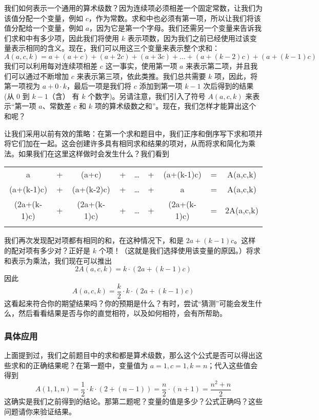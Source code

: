 我们如何表示一个通用的算术级数？因为连续项必须相差一个固定常数，让我们为该值分配一个变量，例如 $c$，作为常数。求和中也必须有第一项，所以让我们将该值分配给一个变量，例如 $a$，因为它是第一个字母。我们还需另一个变量来告诉我们求和中有多少项，因此我们将使用 $k$ 表示项数，因为我们之前已经使用过该变量表示相同的含义。现在，我们可以用这三个变量来表示整个求和：
\[A(a, c, k) = a + (a + c) + (a + 2c) + (a + 3c) + \dots + (a + (k - 2)c) + (a + (k - 1)c)\]
我们可以利用每对连续项相差 $c$ 这一事实，使用第一项 $a$ 来表示第二项，并且我们可以通过不断增加 $c$ 来表示第三项，依此类推。我们总共需要 $k$ 项，因此，将第一项视为 $a+ 0 \cdot k$，最后一项是我们将 $c$ 添加到第一项 $k - 1$ 次后得到的结果(从 $0$ 到 $k - 1$（含） 有 $k$ 个数字)。另请注意，我们引入了符号 $A(a, c, k)$ 来表示“第一项 $a$、常数差 $c$ 和 $k$ 项的算术级数之和”。现在，我们怎样才能算出这个和呢？

让我们采用以前有效的策略：在第一个求和题目中，我们正序和倒序写下求和项并将它们加在一起。这会创建许多具有相同求和结果的项对，从而将求和简化为乘法。如果我们在这里这样做时会发生什么？我们看到

\begin{center}
    \begin{tabular}{ccccccccc}
                 a & + &      (a+c) & + & \dots & + & (a+(k-1)c) & = & A(a,c,k)\\\noalign{\smallskip\smallskip}
        (a+(k-1)c) & + & (a+(k-2)c) & + & \dots & + &          a & = & A(a,c,k)\\\noalign{\smallskip\smallskip}
        \hline
        (2a+(k-1)c)& + & (2a+(k-1)c)& + & \dots & + &(2a+(k-1)c) & = &2A(a,c,k)\\\noalign{\smallskip\smallskip}
    \end{tabular}
\end{center}
我们再次发现配对项都有相同的和，在这种情况下，和是 $2a+ (k-1)c$。这样的配对项有多少对？正好是 $k$ 个项！（这就是我们选择使用该变量的原因。）将求和表示为乘法，我们现在可以推出
\[2A(a, c, k) = k \cdot (2a + (k - 1)c)\]
因此
\[A(a, c, k) = \frac{k}{2} \cdot k \cdot (2a + (k - 1)c)\]
这看起来符合你的期望结果吗？你的预期是什么？有时，尝试“猜测”可能会发生什么，然后看看结果是否与你的直觉相符，以及如何相符，会有所帮助。

\subsubsection*{具体应用}

上面提到过，我们之前题目中的求和都是算术级数，那么这个公式是否可以得出这些求和的正确结果呢？在第一题中，变量值为 $a = 1,c = 1, k = n$；代入这些值会得到
\[A(1, 1, n) = \frac{1}{2} \cdot k \cdot (2 + (n - 1)) = \frac{n}{2} \cdot(n+1) = \frac{n^2+n}{2}\]
这确实是我们之前得到的结论。那第二题呢？变量的值是多少？公式正确吗？这些问题请你来验证结果。

